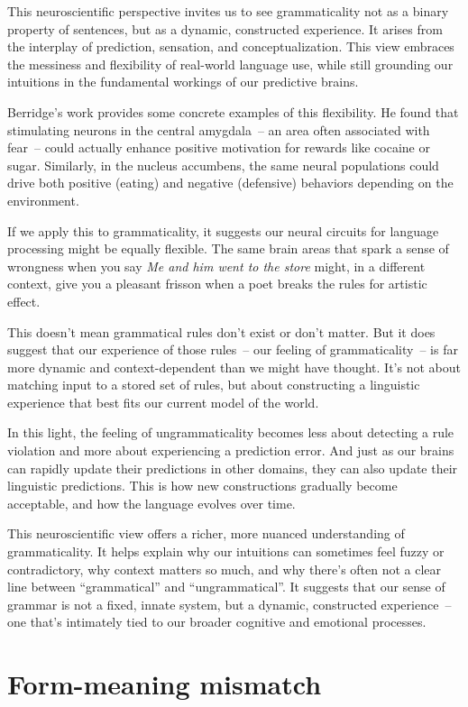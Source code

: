 This neuroscientific perspective invites us to see grammaticality not as a binary property of sentences, but as a dynamic, constructed experience. It arises from the interplay of prediction, sensation, and conceptualization. This view embraces the messiness and flexibility of real-world language use, while still grounding our intuitions in the fundamental workings of our predictive brains.

Berridge's work provides some concrete examples of this flexibility. He found that stimulating neurons in the central amygdala~-- an area often associated with fear~-- could actually enhance positive motivation for rewards like cocaine or sugar. Similarly, in the nucleus accumbens, the same neural populations could drive both positive (eating) and negative (defensive) behaviors depending on the environment.

If we apply this to grammaticality, it suggests our neural circuits for language processing might be equally flexible. The same brain areas that spark a sense of wrongness when you say \textit{Me and him went to the store} might, in a different context, give you a pleasant frisson when a poet breaks the rules for artistic effect.

This doesn't mean grammatical rules don't exist or don't matter. But it does suggest that our experience of those rules~-- our feeling of grammaticality~-- is far more dynamic and context-dependent than we might have thought. It's not about matching input to a stored set of rules, but about constructing a linguistic experience that best fits our current model of the world.

In this light, the feeling of ungrammaticality becomes less about detecting a rule violation and more about experiencing a prediction error. And just as our brains can rapidly update their predictions in other domains, they can also update their linguistic predictions. This is how new constructions gradually become acceptable, and how the language evolves over time.

This neuroscientific view offers a richer, more nuanced understanding of grammaticality. It helps explain why our intuitions can sometimes feel fuzzy or contradictory, why context matters so much, and why there's often not a clear line between ``grammatical'' and ``ungrammatical''. It suggests that our sense of grammar is not a fixed, innate system, but a dynamic, constructed experience~-- one that's intimately tied to our broader cognitive and emotional processes.

\section{Form-meaning mismatch}

